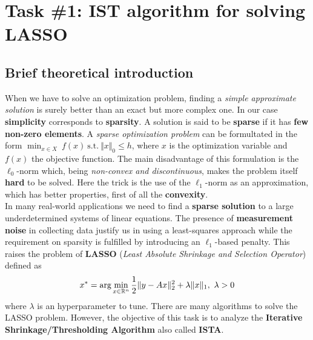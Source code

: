\vspace{-0.5cm}
\section*{Task \#1: IST algorithm for solving LASSO}

\subsection*{Brief theoretical introduction}
When we have to solve an optimization problem, finding a \textit{simple approximate solution} is surely better than an exact but  
more complex one. 
In our case \textbf{simplicity} corresponds to \textbf{sparsity}. A solution is said to be \textbf{sparse} if it has \textbf{few non-zero elements}. A \textit{sparse optimization problem} can be formultated in the form $ \min_{x\in X} \  f(x) \ \text{s.t.} \ \Vert x \Vert_0 \le h$, where $x$ is the optimization variable and $f(x)$ the objective function. The main disadvantage of this formulation is the $\ell_0$-norm which, being \textit{non-convex and discontinuous}, makes the problem itself \textbf{hard} to be solved. Here the trick is the use of the $\ell_1$-norm as an approximation, which has better properties, first of all the \textbf{convexity}.\\
In many real-world applications we need to find a \textbf{sparse solution} to a large underdetermined systems of linear equations. The presence of \textbf{measurement noise} in collecting data justify us in using a least-squares approach while the requirement on sparsity is fulfilled by introducing an $\ell_1$-based penalty. This raises the problem of \textbf{LASSO} (\textit{Least Absolute Shrinkage and Selection Operator}) defined as
\vspace{-0.2cm}
\begin{equation} \label{eq:LASSO} 
    x^* = \text{arg} \min_{x \in \mathbb{R}^n} \frac{1}{2}\Vert y-Ax \Vert_2^2 + \lambda \Vert x \Vert_1, \ \lambda >0
    \vspace{-0.2cm}
\end{equation}
where $\lambda$ is an hyperparameter to tune. There are many algorithms to solve the LASSO problem. However, the objective of this task is to analyze the \textbf{Iterative Shrinkage/Thresholding Algorithm} also called \textbf{ISTA}.

